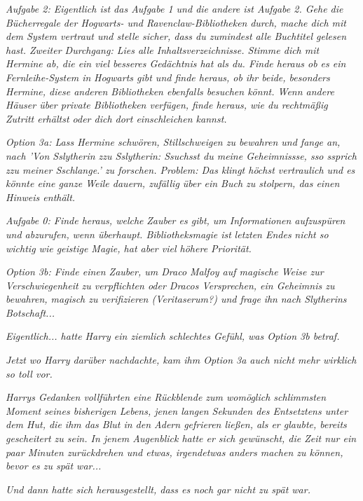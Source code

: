 {\emph{\emph{Aufgabe 2: Eigentlich ist das Aufgabe 1 und die andere ist Aufgabe 2. Gehe die Bücherregale der Hogwarts- und Ravenclaw-Bibliotheken}} \emph{\emph{durch}\emph{, mache dich mit dem System vertraut und stelle sicher, dass du zumindest alle Buchtitel gelesen hast. Zweiter Durchgang: Lies alle Inhaltsverzeichnisse. Stimme dich mit Hermine ab, die ein viel besseres Gedächtnis hat als du. Finde heraus ob es ein Fernleihe-System in}} \emph{\emph{Hogwarts gibt und finde heraus, ob ihr beide, besonders Hermine, diese anderen Bibliotheken ebenfalls besuchen könnt. Wenn andere Häuser über private Bibliotheken verfügen, finde heraus, wie du rechtmäßig Zutritt erhältst oder dich dort einschleichen kannst.}}

\emph{\emph{Option 3a: Lass Hermine schwören, Stillschweigen zu bewahren und fange an, nach '}\emph{V}\emph{on Sslytherin zzu Sslytherin: Ssuchsst du meine Geheimnissse, sso s}\emph{s}\emph{prich zzu meiner Sschlange.}\emph{' zu forschen. Problem: Das klingt höchst vertraulich und es könnte eine ganze Weile dauern, zufällig über ein Buch zu stolpern, das einen Hinweis enthält.}}

\emph{\emph{Aufgabe 0: Finde heraus, w}\emph{elche}} \emph{\emph{Zauber es gibt, um Informationen aufzuspüren und abzurufen,}} \emph{\emph{wenn überhaupt}\emph{. Bibliotheksmagie ist}} \emph{\emph{letzten Endes}} \emph{\emph{nicht so wichtig wie geistige Magie, hat aber viel höhere Priorität.}}

\emph{\emph{Option 3b: Finde einen Zauber, um Draco Malfoy auf magische Weise zur Verschwiegenheit zu verpflichten oder Dracos Versprechen, ein Geheimnis zu bewahren, magisch zu verifizieren (Veritaserum?) und frage}} \emph{ihn} \emph{\emph{nach Slytherins Botschaft...}}

\emph{Eigentlich... hatte Harry ein ziemlich schlechtes Gefühl, was Option 3b betraf.}

\emph{Jetzt wo Harry darüber nachdachte, kam ihm Option 3a auch nicht mehr wirklich so toll vor.}

\emph{Harrys Gedanken vollführten eine Rückblende zum womöglich schlimmsten Moment seines bisherigen Lebens, jenen langen Sekunden des Entsetztens unter dem Hut, die ihm das Blut in den Adern gefrieren ließen, als er glaubte, bereits gescheitert zu sein. In jenem Augenblick hatte er sich gewünscht, die Zeit nur ein paar Minuten zurückdrehen und etwas, irgendetwas anders machen zu können, bevor es zu spät war...}

\emph{Und dann hatte sich herausgestellt, dass es noch gar nicht zu spät war.}

}
